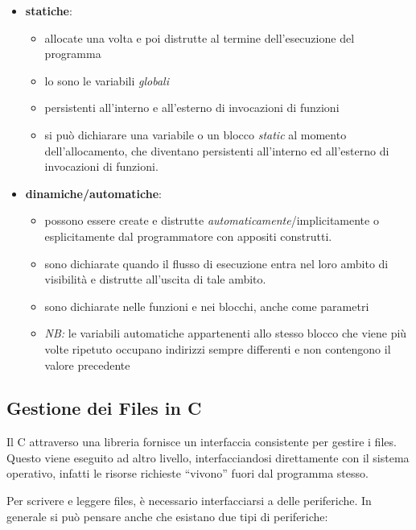 \documentclass[
  paper=a4,
  oneside  ,captions=tableheading
]{scrbook}
\providecommand{\tightlist}{%
  \setlength{\itemsep}{0pt}\setlength{\parskip}{0pt}}
\begin{document}
\begin{itemize}
\tightlist
\item
  \textbf{statiche}:

  \begin{itemize}
  \tightlist
  \item
    allocate una volta e poi distrutte al termine dell'esecuzione del
    programma
  \item
    lo sono le variabili \emph{globali}
  \item
    persistenti all'interno e all'esterno di invocazioni di funzioni
  \item
    si può dichiarare una variabile o un blocco \emph{static} al momento
    dell'allocamento, che diventano persistenti all'interno ed
    all'esterno di invocazioni di funzioni.
  \end{itemize}
\item
  \textbf{dinamiche/automatiche}:

  \begin{itemize}
  \tightlist
  \item
    possono essere create e distrutte
    \emph{automaticamente}/implicitamente o esplicitamente dal
    programmatore con appositi construtti.
  \item
    sono dichiarate quando il flusso di esecuzione entra nel loro ambito
    di visibilità e distrutte all'uscita di tale ambito.
  \item
    sono dichiarate nelle funzioni e nei blocchi, anche come parametri
  \item
    \emph{NB:} le variabili automatiche appartenenti allo stesso blocco
    che viene più volte ripetuto occupano indirizzi sempre differenti e
    non contengono il valore precedente
  \end{itemize}
\end{itemize}

\hypertarget{gestione-dei-files-in-c}{%
\subsection{Gestione dei Files in C}\label{gestione-dei-files-in-c}}

Il C attraverso una libreria fornisce un interfaccia consistente per
gestire i files. Questo viene eseguito ad altro livello,
interfacciandosi direttamente con il sistema operativo, infatti le
risorse richieste ``vivono'' fuori dal programma stesso.

Per scrivere e leggere files, è necessario interfacciarsi a delle
periferiche. In generale si può pensare anche che esistano due tipi di
periferiche:
\end{document}
